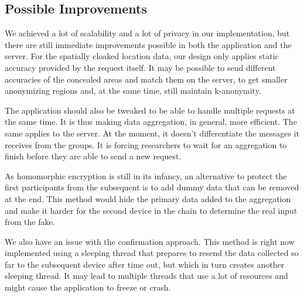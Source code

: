 \subsection{Possible Improvements}
We achieved a lot of scalability and a lot of privacy in our implementation, but there are still immediate improvements possible in both the application and the server. For the spatially cloaked location data, our design only applies static accuracy provided by the request itself. It may be possible to send different accuracies of the concealed areas and match them on the server, to get smaller anonymizing regions and, at the same time, still maintain k-anonymity.

The application should also be tweaked to be able to handle multiple requests at the same time. It is thus making data aggregation, in general, more efficient. The same applies to the server. At the moment, it doesn't differentiate the messages it receives from the groups. It is forcing researchers to wait for an aggregation to finish before they are able to send a new request.

As homomorphic encryption is still in its infancy, an alternative to protect the first participants from the subsequent is to add dummy data that can be removed at the end. This method would hide the primary data added to the aggregation and make it harder for the second device in the chain to determine the real input from the fake.

We also have an issue with the confirmation approach. This method is right now implemented using a sleeping thread that prepares to resend the data collected so far to the subsequent device after time out, but which in turn creates another sleeping thread. It may lead to multiple threads that use a lot of resources and might cause the application to freeze or crash.

